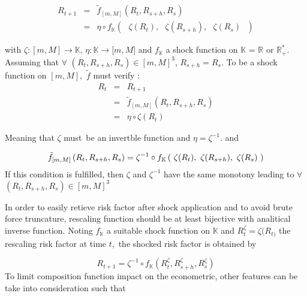 \documentclass[3pt]{article}
\begin{document}
\begin{eqnarray*}
R_{t+1} &=&\tilde{f}_{[m,M]}\left( R_{t},R_{s+h},R_{s}\right)  \\
&=&\eta \circ f_{\mathbb{K}}\left( \text{ }\zeta (R_{t}),\text{ }\zeta
(R_{s+h}),\text{ }\zeta (R_{s})\text{ }\right) 
\end{eqnarray*}

\bigskip 

with $\zeta :[m,M]\rightarrow \mathbb{K}$, $\eta :\mathbb{K}\rightarrow
\lbrack m,M]$ and $f_{\mathbb{K}}$ a shock function on $\mathbb{K}$ = $%
\mathbb{R}$ or $\mathbb{R}_{+}^{\ast }$. Assuming that $\forall $ $%
(R_{t},R_{s+h},R_{s})\in \left[ m,M\right] ^{3}$, $R_{s+h}=R_{s}.$ To be a
shock function on $[m,M],$ $\tilde{f}$ must verify : 
\begin{eqnarray*}
R_{t} &=&R_{t+1} \\
&=&\tilde{f}_{[m,M]}\left( R_{t},R_{s+h},R_{s}\right)  \\
&=&\eta \circ \zeta (R_{t})
\end{eqnarray*}

Meaning that $\zeta $ must\ be an invertble function and $\eta =\zeta ^{-1}.$
and

\begin{equation*}
\tilde{f}_{[m,M]}\left( R_{t},R_{s+h},R_{s}\right) =\zeta ^{-1}\circ f_{%
\mathbb{K}}\left( \text{ }\zeta (R_{t}),\text{ }\zeta (R_{s+h}),\text{ }%
\zeta (R_{s})\text{ }\right) 
\end{equation*}%
If this condition is fulfilled, then $\zeta $ and $\zeta ^{-1}$ have the
same monotony leading to $\forall $ $\left( R_{t},R_{s+h},R_{s}\right) \in %
\left[ m,M\right] ^{3}$

\bigskip 

\bigskip 

\bigskip 

\bigskip 

\bigskip 

\bigskip 

\bigskip 

\bigskip 

In order to easily retieve risk factor after shock application and to avoid
brute force truncature, rescaling function should be at least bijective with
analitical inverse function. Noting $f_{\mathbb{K}}$ a suitable shock
function on $\mathbb{K}$ and $R_{t}^{\zeta }=\zeta (R_{t)}$ the rescaling
risk factor at time $t,$ the shocked risk factor is obtained by

\begin{equation*}
R_{t+1}=\zeta ^{-1}\circ f_{\mathbb{K}}(R_{t}^{\zeta },R_{s+h}^{\zeta
},R_{s}^{\zeta })
\end{equation*}%
To limit composition function impact on the econometric, other features can
be take into consideration such that
\end{document}
